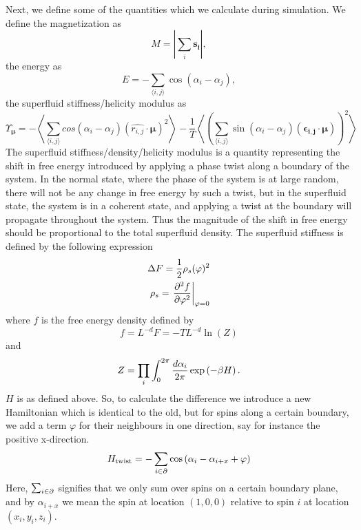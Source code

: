 Next, we define some of the quantities which we calculate during simulation.
We define the magnetization as 
\begin{equation}
  M = \left| \sum_i \bm{s_i}\right|,
  \label{}
\end{equation}
the energy as 
\begin{equation}
  E = -\sum\limits_{\langle i,j \rangle} \cos(\alpha_i - \alpha_j),
  \label{}
\end{equation}
the superfluid stiffness/helicity modulus as 
\begin{equation}
  \Upsilon_{\bm{\mu}} = -\left\langle \sum_{\langle i,j\rangle} cos(\alpha_i - \alpha_j) (\hat{r_{i,j}}\cdot \bm{\mu})^2 \right\rangle - \frac{1}{T}\left\langle\left(\sum_{\langle i,j\rangle} \sin(\alpha_i - \alpha_j)(\bm{\epsilon_{i,j}}\cdot \bm{\mu})\right)^2\right\rangle
  \label{}
\end{equation}
The superfluid stiffness/density/helicity modulus is a quantity representing the shift in free energy introduced by applying a phase twist along a boundary of the system.
In the normal state, where the phase of the system is at large random, there will not be any change in free energy by such a twist, but in the superfluid state, the system is in a coherent state, and applying a twist at the boundary will propagate throughout the system. Thus the magnitude of the shift in free energy should be proportional to the total superfluid density.
The superfluid stiffness is defined by the following expression
\begin{align}
  \Delta F = \frac{1}{2}\rho_s(\varphi)^2\\
  \rho_s = \left. \frac{\partial^{2} f}{\partial \varphi^2}\right|_{\varphi =0}
  \label{}
\end{align}
where $f$ is the free energy density defined by
\begin{equation}
  f = L^{-d}F = -TL^{-d}\ln(Z)
  \label{}
\end{equation}
and 
\begin{equation}
  Z = \prod_{i}\int_{0}^{2\pi}\frac{d \alpha_i}{2\pi} \exp\left(-\beta H\right).
  \label{}
\end{equation}
$H$ is as defined above.
So, to calculate the difference we introduce a new Hamiltonian which is identical to the old, but for spins along a certain boundary, we add a term $\varphi$ for their neighbours in one direction, say for instance the positive x-direction.
\begin{equation}
  H_{\textrm{twist}} = - \sum_{i\in\partial}\cos\left( \alpha_i - \alpha_{i+x} + \varphi \right)
  \label{}
\end{equation}
Here, $\sum_{i\in\partial}$ signifies that we only sum over spins on a certain boundary plane, and by $\alpha_{i+x}$ we mean the spin at location $(1,0,0)$ relative to spin $i$ at location $(x_i,y_i,z_i)$.

